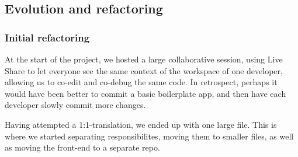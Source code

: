 \subsection{Evolution and refactoring}

\subsubsection{Initial refactoring}

At the start of the project, we hosted a large collaborative session, using Live Share \cite{tool:live-share} to let everyone see the same context of the workspace of one developer, allowing us to co-edit and co-debug the same code.
In retrospect, perhaps it would have been better to commit a basic boilerplate app, and then have each developer slowly commit more changes.

Having attempted a 1:1-translation, we ended up with one large file. This is where we started separating responsibilites, moving them to smaller files, as well as moving the front-end to a separate repo.
